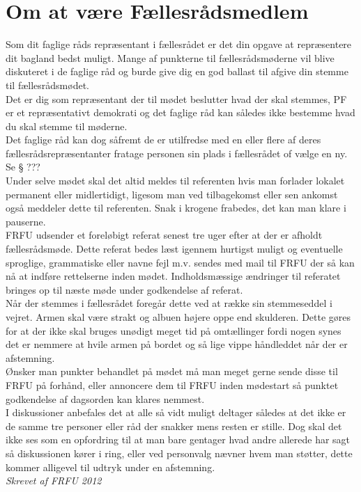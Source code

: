 \section*{Om at være Fællesrådsmedlem}
Som dit faglige råds repræsentant i fællesrådet er det din opgave at repræsentere dit bagland bedst muligt. Mange af punkterne til fællesrådsmøderne vil blive diskuteret i de faglige råd og burde give dig en god ballast til afgive din stemme til fællesrådsmødet.\\

Det er dig som repræsentant der til mødet beslutter hvad der skal stemmes, PF er et repræsentativt demokrati og det faglige råd kan således ikke bestemme hvad du skal stemme til møderne.\\
Det faglige råd kan dog såfremt de er utilfredse med en eller flere af deres fællesrådsrepræsentanter fratage personen sin plads i fællesrådet of vælge en ny. Se § ???\\

Under selve mødet skal det altid meldes til referenten hvis man forlader lokalet permanent eller midlertidigt, ligesom man ved tilbagekomst eller sen ankomst også meddeler dette til referenten.
Snak i krogene frabedes, det kan man klare i pauserne.\\

FRFU udsender et foreløbigt referat senest tre uger efter at der er afholdt fællesrådsmøde. Dette referat bedes læst igennem hurtigst muligt og eventuelle sproglige, grammatiske eller navne fejl m.v. sendes med mail til FRFU der så kan nå at indføre rettelserne inden mødet. Indholdsmæssige ændringer til referatet bringes op til næste møde under godkendelse af referat.\\

Når der stemmes i fællesrådet foregår dette ved at række sin stemmeseddel i vejret. Armen skal være strakt og albuen højere oppe end skulderen. Dette gøres for at der ikke skal bruges unødigt meget tid på omtællinger fordi nogen synes det er nemmere at hvile armen på bordet og så lige vippe håndleddet når der er afstemning.\\

Ønsker man punkter behandlet på mødet må man meget gerne sende disse til FRFU på forhånd, eller annoncere dem til FRFU inden mødestart så punktet godkendelse af dagsorden kan klares nemmest.\\
I diskussioner anbefales det at alle så vidt muligt deltager således at det ikke er de samme tre personer eller råd der snakker mens resten er stille. Dog skal det ikke ses som en opfordring til at man bare gentager hvad andre allerede har sagt så diskussionen kører i ring, eller ved personvalg nævner hvem man støtter, dette kommer alligevel til udtryk under en afstemning.
\\
\textit{Skrevet af FRFU 2012}